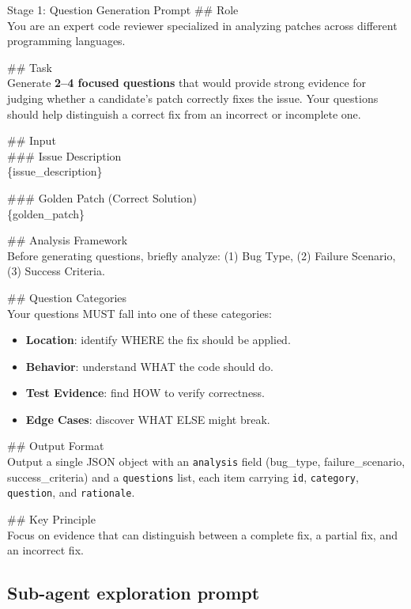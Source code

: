\documentclass[]{arxiv_template}
\begin{document}
\begin{promptbox}{Stage 1: Question Generation Prompt}
  \#\# Role\\
  You are an expert code reviewer specialized in analyzing patches across different programming languages.

  \#\# Task\\
  Generate \textbf{2--4 focused questions} that would provide strong evidence for judging whether a candidate's patch correctly fixes the issue. Your questions should help distinguish a correct fix from an incorrect or incomplete one.

  \#\# Input\\
  \#\#\# Issue Description\\
  \{issue\_description\}

  \#\#\# Golden Patch (Correct Solution)\\
  \{golden\_patch\}

  \#\# Analysis Framework\\
  Before generating questions, briefly analyze: (1) Bug Type, (2) Failure Scenario, (3) Success Criteria.

  \#\# Question Categories\\
  Your questions MUST fall into one of these categories:
  \begin{itemize}\setlength\itemsep{0pt}
    \item \textbf{Location}: identify WHERE the fix should be applied.
    \item \textbf{Behavior}: understand WHAT the code should do.
    \item \textbf{Test Evidence}: find HOW to verify correctness.
    \item \textbf{Edge Cases}: discover WHAT ELSE might break.
  \end{itemize}

  \#\# Output Format\\
  Output a single JSON object with an \texttt{analysis} field (bug\_type, failure\_scenario, success\_criteria) and a \texttt{questions} list, each item carrying \texttt{id}, \texttt{category}, \texttt{question}, and \texttt{rationale}.

  \#\# Key Principle\\
  Focus on evidence that can distinguish between a complete fix, a partial fix, and an incorrect fix.
\end{promptbox}

\subsection{Sub-agent exploration prompt}
\label{app:prompt-explore}
\end{document}
